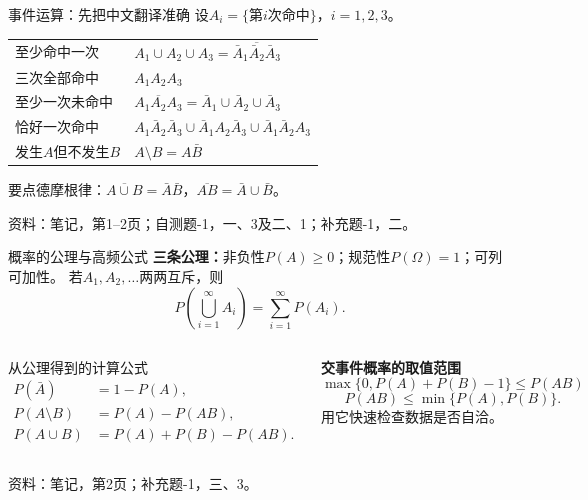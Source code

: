 \documentclass[aspectratio=169,10pt]{beamer}
\newcommand{\source}[1]{\vfill{\color{Muted}\fontsize{6.5}{8}\selectfont 资料：#1\par}}
\newcommand{\key}[1]{\begin{block}{要点}#1\end{block}}
\begin{document}
\begin{frame}[t]{事件运算：先把中文翻译准确}
设$A_i=\{\text{第$i$次命中}\}$，$i=1,2,3$。
\renewcommand{\arraystretch}{1.4}
\begin{center}
\begin{tabular}{ll}
\toprule
至少命中一次 & $A_1\cup A_2\cup A_3=\overline{\bar A_1\bar A_2\bar A_3}$\\
三次全部命中 & $A_1A_2A_3$\\
至少一次未命中 & $\overline{A_1A_2A_3}=\bar A_1\cup\bar A_2\cup\bar A_3$\\
恰好一次命中 & $A_1\bar A_2\bar A_3\cup\bar A_1A_2\bar A_3\cup\bar A_1\bar A_2A_3$\\
发生$A$但不发生$B$ & $A\setminus B=A\bar B$\\\bottomrule
\end{tabular}
\end{center}
\key{德摩根律：$\overline{A\cup B}=\bar A\bar B$，\quad$\overline{AB}=\bar A\cup\bar B$。}
\source{笔记，第1--2页；自测题-1，一、3及二、1；补充题-1，二。}
\end{frame}

\begin{frame}[t]{概率的公理与高频公式}
\textbf{三条公理：}非负性$P(A)\ge0$；规范性$P(\Omega)=1$；可列可加性。
若$A_1,A_2,\ldots$两两互斥，则
\[
P\left(\bigcup_{i=1}^{\infty}A_i\right)=\sum_{i=1}^{\infty}P(A_i).
\]
\begin{columns}[T]
\begin{block}{从公理得到的计算公式}
\vspace{-2mm}
\begin{align*}
P(\bar A)&=1-P(A),\\
P(A\setminus B)&=P(A)-P(AB),\\
P(A\cup B)&=P(A)+P(B)-P(AB).
\end{align*}
\end{block}
\textbf{交事件概率的取值范围}
\[
\max\{0,P(A)+P(B)-1\}\le P(AB)
\]
\[
P(AB)\le\min\{P(A),P(B)\}.
\]
用它快速检查数据是否自洽。
\end{columns}
\source{笔记，第2页；补充题-1，三、3。}
\end{frame}
\end{document}
